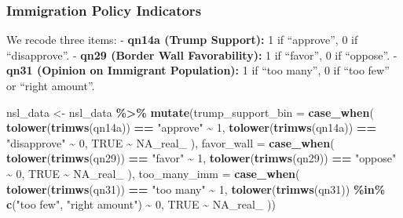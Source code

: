 \documentclass[
]{article}
\newenvironment{Shaded}{\begin{snugshade}}{\end{snugshade}}
\newcommand{\AttributeTok}[1]{\textcolor[rgb]{0.13,0.29,0.53}{#1}}
\newcommand{\ConstantTok}[1]{\textcolor[rgb]{0.56,0.35,0.01}{#1}}
\newcommand{\DecValTok}[1]{\textcolor[rgb]{0.00,0.00,0.81}{#1}}
\newcommand{\FunctionTok}[1]{\textcolor[rgb]{0.13,0.29,0.53}{\textbf{#1}}}
\newcommand{\NormalTok}[1]{#1}
\newcommand{\OtherTok}[1]{\textcolor[rgb]{0.56,0.35,0.01}{#1}}
\newcommand{\SpecialCharTok}[1]{\textcolor[rgb]{0.81,0.36,0.00}{\textbf{#1}}}
\newcommand{\StringTok}[1]{\textcolor[rgb]{0.31,0.60,0.02}{#1}}
\begin{document}
\subsubsection{Immigration Policy
Indicators}\label{immigration-policy-indicators}

We recode three items: - \textbf{qn14a (Trump Support):} 1 if
``approve'', 0 if ``disapprove''. - \textbf{qn29 (Border Wall
Favorability):} 1 if ``favor'', 0 if ``oppose''. - \textbf{qn31 (Opinion
on Immigrant Population):} 1 if ``too many'', 0 if ``too few'' or
``right amount''.

\begin{Shaded}
\begin{Highlighting}[]
\NormalTok{nsl\_data }\OtherTok{\textless{}{-}}\NormalTok{ nsl\_data }\SpecialCharTok{\%\textgreater{}\%}
  \FunctionTok{mutate}\NormalTok{(}\AttributeTok{trump\_support\_bin =} \FunctionTok{case\_when}\NormalTok{(}
           \FunctionTok{tolower}\NormalTok{(}\FunctionTok{trimws}\NormalTok{(qn14a)) }\SpecialCharTok{==} \StringTok{"approve"} \SpecialCharTok{\textasciitilde{}} \DecValTok{1}\NormalTok{,}
           \FunctionTok{tolower}\NormalTok{(}\FunctionTok{trimws}\NormalTok{(qn14a)) }\SpecialCharTok{==} \StringTok{"disapprove"} \SpecialCharTok{\textasciitilde{}} \DecValTok{0}\NormalTok{,}
           \ConstantTok{TRUE} \SpecialCharTok{\textasciitilde{}} \ConstantTok{NA\_real\_}
\NormalTok{         ),}
         \AttributeTok{favor\_wall =} \FunctionTok{case\_when}\NormalTok{(}
           \FunctionTok{tolower}\NormalTok{(}\FunctionTok{trimws}\NormalTok{(qn29)) }\SpecialCharTok{==} \StringTok{"favor"}  \SpecialCharTok{\textasciitilde{}} \DecValTok{1}\NormalTok{,}
           \FunctionTok{tolower}\NormalTok{(}\FunctionTok{trimws}\NormalTok{(qn29)) }\SpecialCharTok{==} \StringTok{"oppose"} \SpecialCharTok{\textasciitilde{}} \DecValTok{0}\NormalTok{,}
           \ConstantTok{TRUE} \SpecialCharTok{\textasciitilde{}} \ConstantTok{NA\_real\_}
\NormalTok{         ),}
         \AttributeTok{too\_many\_imm =} \FunctionTok{case\_when}\NormalTok{(}
           \FunctionTok{tolower}\NormalTok{(}\FunctionTok{trimws}\NormalTok{(qn31)) }\SpecialCharTok{==} \StringTok{"too many"} \SpecialCharTok{\textasciitilde{}} \DecValTok{1}\NormalTok{,}
           \FunctionTok{tolower}\NormalTok{(}\FunctionTok{trimws}\NormalTok{(qn31)) }\SpecialCharTok{\%in\%} \FunctionTok{c}\NormalTok{(}\StringTok{"too few"}\NormalTok{, }\StringTok{"right amount"}\NormalTok{) }\SpecialCharTok{\textasciitilde{}} \DecValTok{0}\NormalTok{,}
           \ConstantTok{TRUE} \SpecialCharTok{\textasciitilde{}} \ConstantTok{NA\_real\_}
\NormalTok{         ))}
\end{Highlighting}
\end{Shaded}
\end{document}
